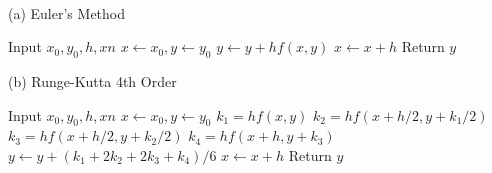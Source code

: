 \\{(a) Euler’s Method}
\begin{algorithm}[H]
\caption{Euler’s Method}
\begin{algorithmic}[1]
\STATE Input $x_0, y_0, h, xn$
\STATE $x \gets x_0, y \gets y_0$
    \STATE $y \gets y + h f(x,y)$
    \STATE $x \gets x + h$
\ENDWHILE
\STATE Return $y$
\end{algorithmic}
\end{algorithm}
{(b) Runge-Kutta 4th Order}
\begin{algorithm}[H]
\caption{Runge-Kutta 4th Order}
\begin{algorithmic}[1]
\STATE Input $x_0, y_0, h, xn$
\STATE $x \gets x_0, y \gets y_0$
    \STATE $k_1 = h f(x,y)$
    \STATE $k_2 = h f(x + h/2, y + k_1/2)$
    \STATE $k_3 = h f(x + h/2, y + k_2/2)$
    \STATE $k_4 = h f(x + h, y + k_3)$
    \STATE $y \gets y + (k_1 + 2k_2 + 2k_3 + k_4)/6$
    \STATE $x \gets x + h$
\ENDWHILE
\STATE Return $y$
\end{algorithmic}
\end{algorithm}
